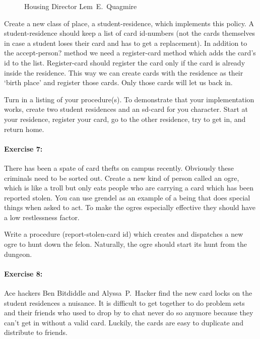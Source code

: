 \begin{figure}
\vspace{3in}
\caption[]{Housing Director Lem~E.\ Quagmire}
\end{figure}


Create a new class of place, a {\cf student-residence}, which
implements this policy.
A student-residence should keep a list of card id-numbers (not the
cards themselves in case a student loses their card and has to get a
replacement).
In addition to the {\cf accept-person?} method we need a {\cf
register-card} method which adds the card's id to the list.
{\cf Register-card} should register the card only if the card is already
inside the residence.
This way we can create cards with the residence as their `birth place'
and register those cards.  Only those cards will let us back in.

%
Turn in a listing of your procedure(s).  To demonstrate that your
implementation works, create two student residences and an sd-card for
you character. Start at your residence, register your card, go to the
other residence, try to get in, and return home.


\paragraph{Exercise 7:}

There has been a spate of card thefts on campus recently.  Obviously
these criminals need to be sorted out.  Create a new kind of person
called an {\cf ogre}, which is like a troll but only eats people who
are carrying a card which has been reported stolen.  You can use {\cf
grendel} as an example of a being that does special things when asked
to act.  To make the ogres especially effective they should have a low
restlessness factor.

Write a procedure {\cf (report-stolen-card id)} which creates and
dispatches a new ogre to hunt down the felon.
Naturally, the ogre should start its hunt from the dungeon.

\paragraph{Exercise 8:}

Ace hackers Ben Bitdiddle and Alyssa~P.\ Hacker find the new card
locks on the student residences a nuisance.  It is difficult to get
together to do problem sets and their friends who used to drop by to
chat never do so anymore because they can't get in without a valid
card.  Luckily, the cards are easy to duplicate and distribute to friends.


